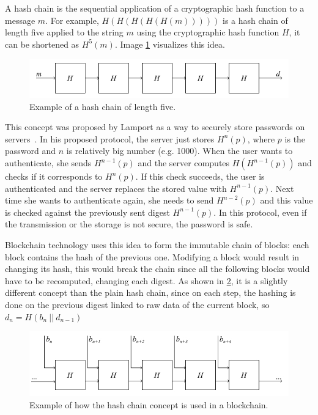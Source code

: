 A hash chain is the sequential application of a cryptographic hash function to a message $m$. For example, $H(H(H(H(H(m)))))$ is a hash chain of length five applied to the string $m$ using the cryptographic hash function $H$, it can be shortened as $H^5(m)$. Image \ref{fig:hash-chain-1} visualizes this idea.

\begin{figure}[H]
  \centering
  \includegraphics[width=1\textwidth]{Figures/background/hashchain_1.jpg}
  \caption[]{Example of a hash chain of length five.}
  \label{fig:hash-chain-1}
\end{figure}

This concept was proposed by Lamport as a way to securely store passwords on servers~\cite{hashchain}. In his proposed protocol, the server just stores $H^n(p)$, where $p$ is the password and $n$ is relatively big number (e.g. 1000). When the user wants to authenticate, she sends $H^{n-1}(p)$ and the server computes $H(H^{n-1}(p))$ and checks if it corresponds to $H^n(p)$. If this check succeeds, the user is authenticated and the server replaces the stored value with $H^{n-1}(p)$. Next time she wants to authenticate again, she needs to send $H^{n-2}(p)$ and this value is checked against the previously sent digest $H^{n-1}(p)$. In this protocol, even if the transmission or the storage is not secure, the password is safe.

Blockchain technology uses this idea to form the immutable chain of blocks: each block contains the hash of the previous one. Modifying a block would result in changing its hash, this would break the chain since all the following blocks would have to be recomputed, changing each digest. As shown in \cref{fig:hash-chain-2}, it is a slightly different concept than the plain hash chain, since on each step, the hashing is done on the previous digest linked to raw data of the current block, so $d_{n}=H(b_n~||~d_{n-1})$

\begin{figure}[H]
  \centering
  \includegraphics[width=1\textwidth]{Figures/background/hashchain_2.jpg}
  \caption[]{Example of how the hash chain concept is used in a blockchain.}
  \label{fig:hash-chain-2}
\end{figure}

